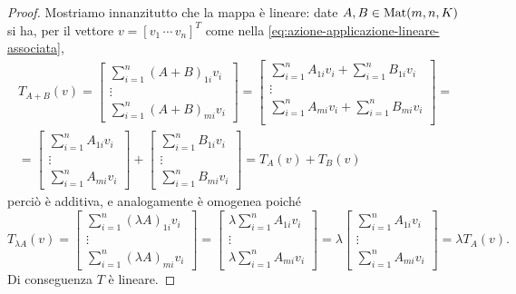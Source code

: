 \begin{proof}
	Mostriamo innanzitutto che la mappa è lineare: date $A,B\in\operatorname{Mat}(m,n,K)$ si ha, per il vettore $v=[v_1\,\cdots\,v_n]^T$ come nella \eqref{eq:azione-applicazione-lineare-associata},
	\begin{multline}
		T_{A+B}(v)=
		\begin{bmatrix}
			\sum_{i=1}^n(A+B)_{1i}v_i\\
			\vdots\\
			\sum_{i=1}^n(A+B)_{mi}v_i
		\end{bmatrix}
		=
		\begin{bmatrix}
			\sum_{i=1}^nA_{1i}v_i+\sum_{i=1}^nB_{1i}v_i\\
			\vdots\\
			\sum_{i=1}^nA_{mi}v_i+\sum_{i=1}^nB_{mi}v_i\\
		\end{bmatrix}
		=\\=
		\begin{bmatrix}
			\sum_{i=1}^nA_{1i}v_i\\
			\vdots\\
			\sum_{i=1}^nA_{mi}v_i
		\end{bmatrix}
		+
		\begin{bmatrix}
			\sum_{i=1}^nB_{1i}v_i\\
			\vdots\\
			\sum_{i=1}^nB_{mi}v_i
		\end{bmatrix}
		=T_A(v)+T_B(v)
		\label{eq:additivita-matrice-associata}
	\end{multline}
	perciò è additiva, e analogamente è omogenea poich\'e
	\begin{equation}
		T_{\lambda A}(v)=
		\begin{bmatrix}
			\sum_{i=1}^n(\lambda A)_{1i}v_i\\
			\vdots\\
			\sum_{i=1}^n(\lambda A)_{mi}v_i
		\end{bmatrix}
		=
		\begin{bmatrix}
			\lambda\sum_{i=1}^nA_{1i}v_i\\
			\vdots\\
			\lambda\sum_{i=1}^nA_{mi}v_i
		\end{bmatrix}
		=\lambda
		\begin{bmatrix}
			\sum_{i=1}^nA_{1i}v_i\\
			\vdots\\
			\sum_{i=1}^nA_{mi}v_i
		\end{bmatrix}
		=\lambda T_A(v).
		\label{eq:omogeneita-matrice-associata}
	\end{equation}
	Di conseguenza $T$ è lineare.


\end{proof}
